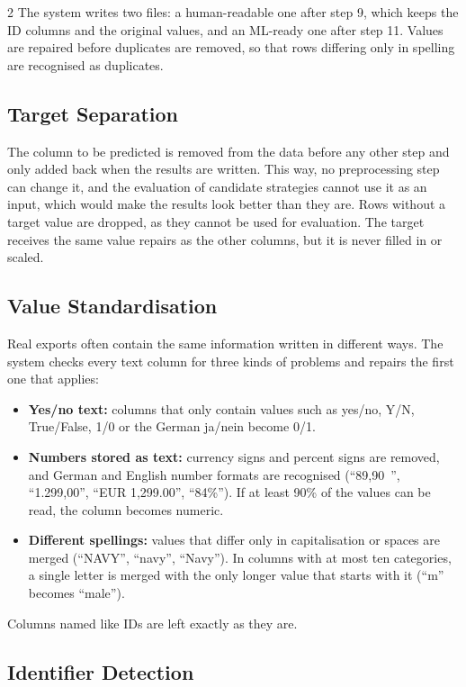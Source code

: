 \documentclass[11pt,a4paper]{article}
\begin{document}
\begin{multicols}{2}
The system writes two files: a human-readable one after step 9, which keeps the ID columns and the original values, and an ML-ready one after step 11. Values are repaired before duplicates are removed, so that rows differing only in spelling are recognised as duplicates.

\subsection{Target Separation}

The column to be predicted is removed from the data before any other step and only added back when the results are written. This way, no preprocessing step can change it, and the evaluation of candidate strategies cannot use it as an input, which would make the results look better than they are. Rows without a target value are dropped, as they cannot be used for evaluation. The target receives the same value repairs as the other columns, but it is never filled in or scaled.

\subsection{Value Standardisation}

Real exports often contain the same information written in different ways. The system checks every text column for three kinds of problems and repairs the first one that applies:

\begin{itemize}[leftmargin=*]
    \item \textbf{Yes/no text:} columns that only contain values such as yes/no, Y/N, True/False, 1/0 or the German ja/nein become 0/1.
    \item \textbf{Numbers stored as text:} currency signs and percent signs are removed, and German and English number formats are recognised (``89,90~\texteuro'', ``1.299,00'', ``EUR 1,299.00'', ``84\%''). If at least 90\% of the values can be read, the column becomes numeric.
    \item \textbf{Different spellings:} values that differ only in capitalisation or spaces are merged (``NAVY'', ``navy'', ``Navy''). In columns with at most ten categories, a single letter is merged with the only longer value that starts with it (``m'' becomes ``male'').
\end{itemize}

Columns named like IDs are left exactly as they are.

\subsection{Identifier Detection}


\end{multicols}
\end{document}
